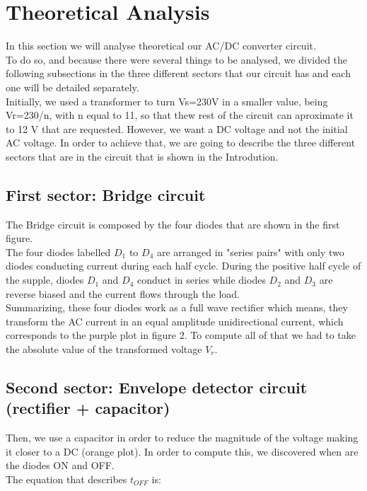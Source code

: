 \section{Theoretical Analysis}
\label{sec:analysis}

In this section we will analyse theoretical our AC/DC converter circuit. \\
To do so, and because there were several things to be analysed, we divided the following subsections in the three different sectors that our circuit has and each one will be detailed separately.\\
Initially, we used a transformer to turn Vs=230V in a smaller value, being Vr=230/n, with n equal to 11, so that thew
rest of the circuit can aproximate it to 12 V that are requested. However, we want a DC voltage and not the initial AC voltage. In order
to achieve that, we are going to describe the three different sectors that are in the circuit that is shown in the Introdution.\\


\subsection{First sector: Bridge circuit}

The Bridge circuit is composed by the four diodes that are shown in the first figure.\\
The four diodes labelled $D_1$ to $D_4$ are arranged in "series pairs" with only two diodes conducting current during each half cycle. During the positive half cycle of the supple, diodes $D_1$ and $D_4$ conduct in series while diodes $D_2$ and $D_3$ are reverse biased and the current flows through the load.\\
Summarizing, these four diodes work as a full wave rectifier which means, they transform the AC current in an equal
amplitude unidirectional current, which corresponds to the purple plot in figure 2. To compute all of that we had to take the absolute value of the transformed voltage $V_r$.

\subsection{Second sector: Envelope detector circuit (rectifier + capacitor)}

Then, we use a capacitor in order to reduce the magnitude of the voltage making it closer to a DC (orange plot).
In order to compute this, we discovered when are the diodes ON and OFF.\\
The equation that describes $t_{OFF}$ is:

